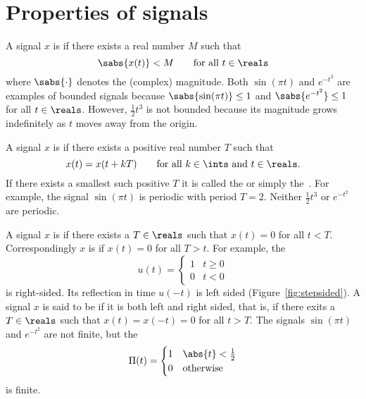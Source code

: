 \section{Properties of signals}\label{sec:properties-signals}

A signal $x$ is  if there exists a real number $M$ such that 
\[
\sabs{x(t)} < M \qquad \text{for all $t \in \reals$} 
\]
where $\sabs{\cdot}$ denotes the (complex) magnitude.  Both $\sin( \pi t)$ and $e^{-t^2}$ are examples of bounded signals because $\sabs{\sin( \pi t)} \leq 1$ and $\sabs{e^{-t^2}} \leq 1$ for all $t \in \reals$.  However, $\frac{1}{2}t^3$ is not bounded because its magnitude grows indefinitely as $t$ moves away from the origin.  %

A signal $x$ is  if there exists a positive real number $T$ such that
\[
x(t) = x(t + kT) \qquad \text{for all $k \in \ints$ and $t \in \reals$.}
\]
If there exists a smallest such positive $T$ it is called the  or simply the~.  For example, the signal $\sin( \pi t)$ is periodic with period $T=2$.  Neither $\frac{1}{2}t^3$ or $e^{-t^2}$ are periodic.  %

\newcommand{\rect}{\Pi}

A signal $x$ is  if there exists a $T \in \reals$ such that $x(t) = 0$ for all $t < T$.  Correspondingly $x$ is  if $x(t) = 0$ for all $T > t$.  For example, the  
\begin{equation} \label{eq:stepfunction}
u(t) = \begin{cases}
1 & t \geq 0 \\
0 & t < 0
\end{cases}
\end{equation}
is right-sided.  Its reflection in time $u(-t)$ is left sided (Figure~\ref{fig:stepsided}).  A signal $x$ is said to be  if it is both left and right sided, that is, if there exits a $T\in\reals$ such that $x(t) = x(-t) = 0$ for all $t > T$.  The signals $\sin( \pi t)$ and $e^{-t^2}$ are not finite, but the 
\begin{equation}\label{eq:rectfuncdefn}
\rect(t) = \begin{cases} 
1 & \abs{t} < \frac{1}{2}\\
0 & \text{otherwise}
\end{cases}
\end{equation}
is finite.  %

